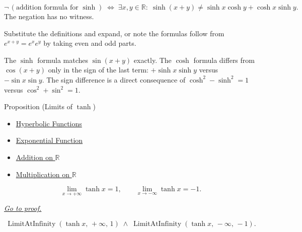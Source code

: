 \begin{remark*}
\[
  \neg\,(\text{addition formula for }\sinh)
  \;\iff\;
  \exists x,y\in\mathbb{R}:\;
  \sinh(x+y) \neq \sinh x\cosh y + \cosh x\sinh y.
\]
The negation has no witness.
\end{remark*}

\begin{remark*}
Substitute the definitions and expand, or note the formulas follow
from $e^{x+y} = e^x e^y$ by taking even and odd parts.
\end{remark*}

\begin{remark*}
The $\sinh$ formula matches $\sin(x+y)$ exactly. The $\cosh$ formula
differs from $\cos(x+y)$ only in the sign of the last term:
$+\sinh x\sinh y$ versus $-\sin x\sin y$. The sign difference is a
direct consequence of $\cosh^2 - \sinh^2 = 1$ versus
$\cos^2 + \sin^2 = 1$.
\end{remark*}


\begin{propositionbox}{Proposition (Limits of $\tanh$)}

\begin{dependencies}
\begin{itemize}
  \item \hyperref[def:hyperbolic]{Hyperbolic Functions}
  \item \hyperref[def:exponential]{Exponential Function}
  \item \hyperref[def:addition-on-r]{Addition on $\mathbb{R}$}
  \item \hyperref[def:multiplication-on-r]{Multiplication on $\mathbb{R}$}
\end{itemize}
\end{dependencies}
\begin{proposition}
\label{prop:tanh-limits}
\[
  \lim_{x \to +\infty} \tanh x = 1,
  \qquad
  \lim_{x \to -\infty} \tanh x = -1.
\]

\smallskip\noindent
\hyperref[prf:tanh-limits]{\textit{Go to proof.}}
\end{proposition}
\end{propositionbox}\begin{remark*}
\[
  \operatorname{LimitAtInfinity}(\tanh x,\,+\infty,\,1)
  \;\wedge\;
  \operatorname{LimitAtInfinity}(\tanh x,\,-\infty,\,-1).
\]
\end{remark*}

